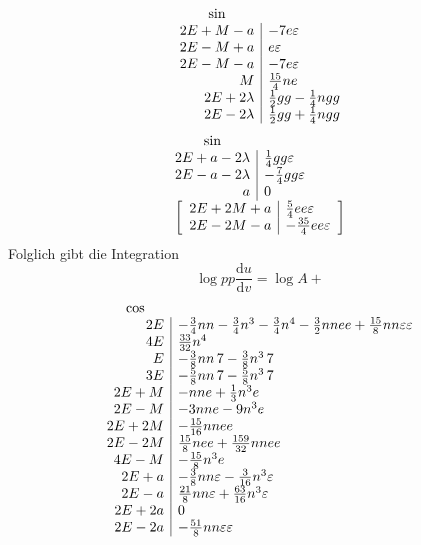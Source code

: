 \[
\begin{array}{r|l}
\multicolumn{1}{c}{\sin}&\\
2E+M-a&-7e\varepsilon\\
2E-M+a&e\varepsilon\\
2E-M-a&-7e\varepsilon\\
M&\tfrac{15}{4}ne\\
2E+2\lambda&\tfrac12gg-\tfrac14ngg\\
2E-2\lambda&\tfrac12gg+\tfrac14ngg
\end{array}
\]
\[
\begin{array}{r|l}
\multicolumn{1}{c}{\sin}&\\
2E+a-2\lambda&\tfrac14gg\varepsilon\\
2E-a-2\lambda&-\tfrac74gg\varepsilon\\
a&0\\
\multicolumn{2}{c}{\left[\begin{array}{r|l}
2E+2M+a&\tfrac54ee\varepsilon\\
2E-2M-a&-\tfrac{35}{4}ee\varepsilon
\end{array}\right]}
\end{array}
\]
\noindent Folglich gibt die Integration
\[
\log pp\frac{\mathrm du}{\mathrm dv}=\log A+
\]
\[
\begin{array}{r|l}
\multicolumn{1}{c}{\cos}&\\
2E&-\tfrac34nn-\tfrac34n^3-\tfrac34n^4-\tfrac32nnee+\tfrac{15}{8}nn\varepsilon\varepsilon\\
4E&\tfrac{33}{32}n^4\\
E&-\tfrac38nn\,7-\tfrac38n^3\,7\\
3E&-\tfrac58nn\,7-\tfrac58n^3\,7\\
2E+M&-nne+\tfrac13n^3e\\
2E-M&-3nne-9n^3e\\
2E+2M&-\tfrac{15}{16}nnee\\
2E-2M&\tfrac{15}{8}nee+\tfrac{159}{32}nnee\\
4E-M&-\tfrac{15}{8}n^3e\\
2E+a&-\tfrac38nn\varepsilon-\tfrac{3}{16}n^3\varepsilon\\
2E-a&\tfrac{21}{8}nn\varepsilon+\tfrac{63}{16}n^3\varepsilon\\
2E+2a&0\\
2E-2a&-\tfrac{51}{8}nn\varepsilon\varepsilon
\end{array}
\]
